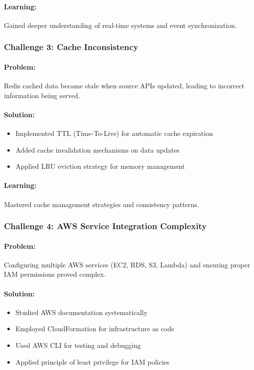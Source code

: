 \paragraph{Learning:} Gained deeper understanding of real-time systems and event synchronization.

\subsubsection{Challenge 3: Cache Inconsistency}

\paragraph{Problem:} Redis cached data became stale when source APIs updated, leading to incorrect information being served.

\paragraph{Solution:}
\begin{itemize}
    \item Implemented TTL (Time-To-Live) for automatic cache expiration
    \item Added cache invalidation mechanisms on data updates
    \item Applied LRU eviction strategy for memory management
\end{itemize}

\paragraph{Learning:} Mastered cache management strategies and consistency patterns.

\subsubsection{Challenge 4: AWS Service Integration Complexity}

\paragraph{Problem:} Configuring multiple AWS services (EC2, RDS, S3, Lambda) and ensuring proper IAM permissions proved complex.

\paragraph{Solution:}
\begin{itemize}
    \item Studied AWS documentation systematically
    \item Employed CloudFormation for infrastructure as code
    \item Used AWS CLI for testing and debugging
    \item Applied principle of least privilege for IAM policies
\end{itemize}


